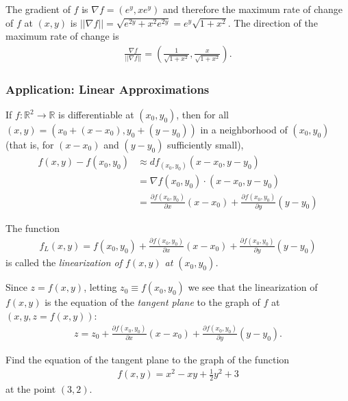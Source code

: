 \documentclass[12pt,letterpaper,reqno]{article}
\numberwithin{equation}{section}
\newcommand{\R}{\ensuremath{\mathbb R}}
\begin{document}
{{\color{red}
\begin{solution}
	The gradient of $f$ is $\nabla f=(e^y,xe^y)$ and therefore the maximum rate of change of $f$ at $(x,y)$ is $||\nabla f||=\sqrt{e^{2y}+x^2e^{2y}}=e^y\sqrt{1+x^2}$. The direction of the maximum rate of change is 
	\begin{align*}
		\frac{\nabla f}{||\nabla f||}=\left(\frac{1}{\sqrt{1+x^2}},\frac{x}{\sqrt{1+x^2}}\right).
	\end{align*}
\end{solution}}

\subsubsection{Application: Linear Approximations}\label{sec:linear_approx}
If $f:\R^2 \to \R$ is differentiable at $(x_0,y_0)$, then for all $(x,y)=(x_0+(x-x_0),y_0+(y-y_0))$ in a neighborhood of $(x_0,y_0)$ (that is, for $(x-x_0)$ and $(y-y_0)$ sufficiently small),
\begin{align*}
	f(x,y)-f(x_0,y_0)&\approx df_{(x_0,y_0)}(x-x_0,y-y_0) \\
	&=\nabla f(x_0,y_0) \cdot (x-x_0,y-y_0) \\
	&=\frac{\partial f(x_0,y_0)}{\partial x}(x-x_0)+\frac{\partial f(x_0,y_0)}{\partial y}(y-y_0)
\end{align*}
\begin{defn}
	The function
\begin{align*}
	f_L(x,y)=f(x_0,y_0)+\frac{\partial f(x_0,y_0)}{\partial x}(x-x_0)+\frac{\partial f(x_0,y_0)}{\partial y}(y-y_0)
\end{align*}
is called the \emph{linearization of $f(x,y)$ at $(x_0,y_0)$.}
\end{defn}

Since $z=f(x,y)$, letting $z_0\equiv f(x_0,y_0)$ we see that the linearization of $f(x,y)$ is the equation of the \emph{tangent plane} to the graph of $f$ at $(x,y,z=f(x,y))$:
\begin{align*}
	z=z_0+\frac{\partial f(x_0,y_0)}{\partial x}(x-x_0)+\frac{\partial f(x_0,y_0)}{\partial y}(y-y_0).
\end{align*}


\begin{exercise}
Find the equation of the tangent plane to the graph of the function
\begin{align*}
	f(x,y)=x^2-xy+\frac{1}{2}y^2+3
\end{align*}	
at the point $(3,2)$.
\end{exercise}

}
\end{document}
